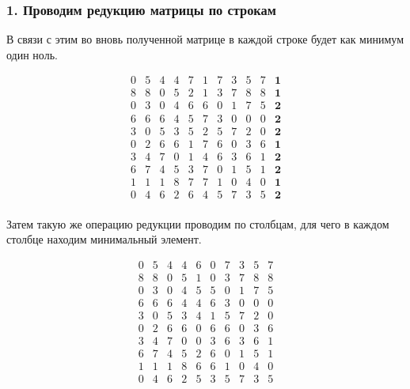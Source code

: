 \documentclass[17pt]{extarticle}
\begin{document}
\subsubsection*{1. Проводим редукцию матрицы по строкам}

В связи с этим во вновь полученной матрице в каждой строке будет как минимум один ноль.

\[
    \begin{array}{*{11}{c}}
        0 & 5 & 4 & 4 & 7 & 1 & 7 & 3 & 5 & 7 & \textbf{1} \\
        8 & 8 & 0 & 5 & 2 & 1 & 3 & 7 & 8 & 8 & \textbf{1} \\
        0 & 3 & 0 & 4 & 6 & 6 & 0 & 1 & 7 & 5 & \textbf{2} \\
        6 & 6 & 6 & 4 & 5 & 7 & 3 & 0 & 0 & 0 & \textbf{2} \\
        3 & 0 & 5 & 3 & 5 & 2 & 5 & 7 & 2 & 0 & \textbf{2} \\
        0 & 2 & 6 & 6 & 1 & 7 & 6 & 0 & 3 & 6 & \textbf{1} \\
        3 & 4 & 7 & 0 & 1 & 4 & 6 & 3 & 6 & 1 & \textbf{2} \\
        6 & 7 & 4 & 5 & 3 & 7 & 0 & 1 & 5 & 1 & \textbf{2} \\
        1 & 1 & 1 & 8 & 7 & 7 & 1 & 0 & 4 & 0 & \textbf{1} \\
        0 & 4 & 6 & 2 & 6 & 4 & 5 & 7 & 3 & 5 & \textbf{2} \\
    \end{array}
\]

Затем такую же операцию редукции проводим по столбцам, для чего в каждом столбце находим минимальный элемент.

\[
    \begin{array}{*{10}{c}}
        0 & 5 & 4 & 4 & 6 & 0 & 7 & 3 & 5 & 7 \\
        8 & 8 & 0 & 5 & 1 & 0 & 3 & 7 & 8 & 8 \\
        0 & 3 & 0 & 4 & 5 & 5 & 0 & 1 & 7 & 5 \\
        6 & 6 & 6 & 4 & 4 & 6 & 3 & 0 & 0 & 0 \\
        3 & 0 & 5 & 3 & 4 & 1 & 5 & 7 & 2 & 0 \\
        0 & 2 & 6 & 6 & 0 & 6 & 6 & 0 & 3 & 6 \\
        3 & 4 & 7 & 0 & 0 & 3 & 6 & 3 & 6 & 1 \\
        6 & 7 & 4 & 5 & 2 & 6 & 0 & 1 & 5 & 1 \\
        1 & 1 & 1 & 8 & 6 & 6 & 1 & 0 & 4 & 0 \\
        0 & 4 & 6 & 2 & 5 & 3 & 5 & 7 & 3 & 5 \\
    \end{array}
\]
\end{document}
